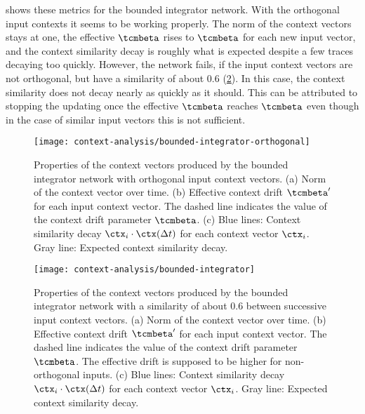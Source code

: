  shows these metrics for the bounded integrator network. With the orthogonal input contexts it seems to be working properly.
The norm of the context vectors stays at one, the effective $\tcmbeta$ rises to $\tcmbeta$ for each new input vector, and the context similarity decay is roughly what is expected despite a few traces decaying too quickly.
However, the network fails, if the input context vectors are not orthogonal, but have a similarity of about $0.6$ (\cref{fig:bounded-integrator}).
In this case, the context similarity does not decay nearly as quickly as it should.
This can be attributed to stopping the updating once the effective $\tcmbeta$ reaches $\tcmbeta$ even though in the case of similar input vectors this is not sufficient.
\begin{figure}
    \centering
    \texttt{[image: context-analysis/bounded-integrator-orthogonal]}
    \caption{
        Properties of the context vectors produced by the bounded integrator network with orthogonal input context vectors.
        (a) Norm of the context vector over time.
        (b) Effective context drift $\tcmbeta'$ for each input context vector. The dashed line indicates the value of the context drift parameter $\tcmbeta$.
        (c) Blue lines: Context similarity decay $\ctx_i \cdot \ctx(\Delta t)$ for each context vector $\ctx_i$. Gray line: Expected context similarity decay.
    }\label{fig:bounded-integrator-orthogonal}
\end{figure}
\begin{figure}
    \centering
    \texttt{[image: context-analysis/bounded-integrator]}
    \caption{
        Properties of the context vectors produced by the bounded integrator network with a similarity of about $0.6$ between successive input context vectors.
        (a) Norm of the context vector over time.
        (b) Effective context drift $\tcmbeta'$ for each input context vector. The dashed line indicates the value of the context drift parameter $\tcmbeta$. The effective drift is supposed to be higher for non-orthogonal inputs.
        (c) Blue lines: Context similarity decay $\ctx_i \cdot \ctx(\Delta t)$ for each context vector $\ctx_i$. Gray line: Expected context similarity decay.
    }\label{fig:bounded-integrator}
\end{figure}

